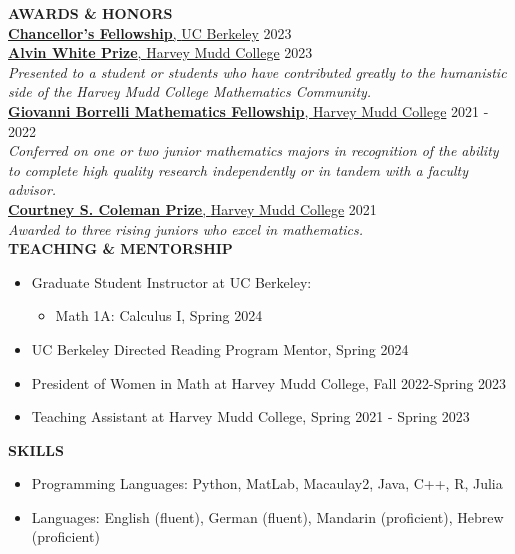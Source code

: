 \documentclass[11pt]{article}
\newcommand{\hdr}[1]{\textcolor{blue(ryb)}{\textbf{#1}}}
\newcommand{\role}[3]{\underline{\textbf{#1}, {#2}} \hfill #3}
\begin{document}
\medskip
\hdr{AWARDS \& HONORS}\\
\role{Chancellor's Fellowship}{UC Berkeley}{2023}\\
\role{Alvin White Prize}{Harvey Mudd College}{2023}\\
\textit{Presented to a student or students who have contributed greatly to the humanistic side of the Harvey Mudd College Mathematics Community.}\\
\role{Giovanni Borrelli Mathematics Fellowship}{Harvey Mudd College}{2021 - 2022}\\
\textit{Conferred on one or two junior mathematics majors in recognition of the ability to complete high quality research independently or in tandem with a faculty advisor.}\\
\role{Courtney S. Coleman Prize}{Harvey Mudd College}{2021}\\
\textit{Awarded to three rising juniors who excel in mathematics.}\\
\hdr{TEACHING \& MENTORSHIP}\\
\begin{itemize}
\item Graduate Student Instructor at UC Berkeley:
  \begin{itemize}
  \item Math 1A: Calculus I, Spring 2024
  \end{itemize}
\item UC Berkeley Directed Reading Program Mentor, Spring 2024
\item President of Women in Math at Harvey Mudd College, Fall 2022-Spring 2023
\item Teaching Assistant at Harvey Mudd College, Spring 2021 - Spring 2023
\end{itemize}
\hdr{SKILLS}\\
\begin{itemize}
\item 
Programming Languages: Python, MatLab, Macaulay2, Java, C++, R, Julia\\
\item 
Languages: English (fluent), German (fluent), Mandarin (proficient), Hebrew (proficient)
\end{itemize}
\end{document}
